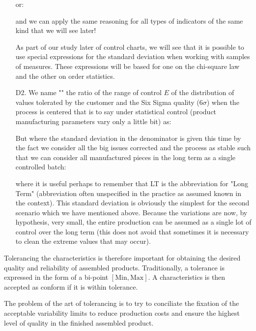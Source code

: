 \begin{enumerate}
		or:	
		
		and we can apply the same reasoning for all types of indicators of the same kind that we will see later!
		\begin{tcolorbox}[title=Remark,colframe=black,arc=10pt]
As part of our study later of control charts, we will see that it is possible to use special expressions for the standard deviation when working with samples of measures. These expressions will be based for one on the chi-square law and the other on order statistics.
		\end{tcolorbox}
				\item[D2.] We name "" the ratio of the range of control $E$ of the distribution of values tolerated by the customer and the Six Sigma quality ($6 \sigma$) when the process is centered that is to say under statistical control (product manufacturing parameters vary only a little bit) as:
			
			But where the standard deviation in the denominator is given this time by the fact we consider all the big issues corrected and the process as stable such that we can consider all manufactured pieces in the long term as a single controlled batch:
			
			where it is useful perhaps to remember that LT is the abbreviation for "Long Term" (abbreviation often unspecified in the practice as assumed known in the context). This standard deviation is obviously the simplest for the second scenario which we have mentioned above. Because the variations are now, by hypothesis, very small, the entire production can be assumed as a single lot of control over the long term (this does not avoid that sometimes it is necessary to clean the extreme values that may occur).
	\end{enumerate}
Tolerancing the characteristics is therefore important for obtaining the desired quality and reliability of assembled products. Traditionally, a tolerance is expressed in the form of a bi-point $[\text{Min}, \text{Max}]$. A characteristics is then accepted as conform if it is within tolerance.

The problem of the art of tolerancing is to try to conciliate the fixation of the acceptable variability limits to reduce production costs and ensure the highest level of quality in the finished assembled product.

